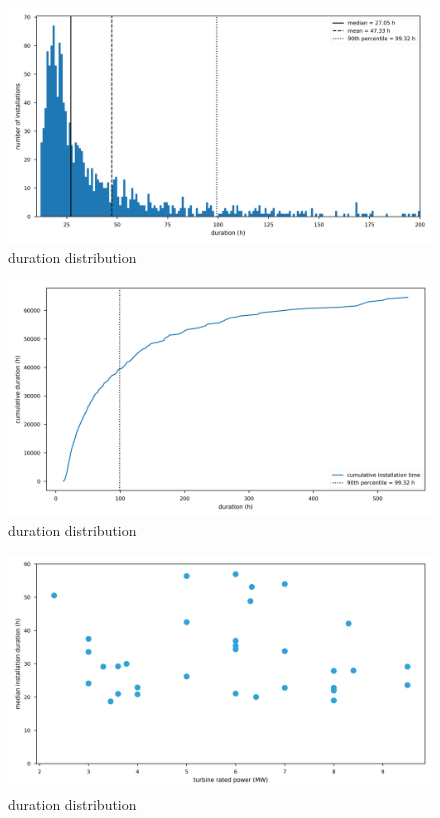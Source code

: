 \documentclass[wes, manuscript]{copernicus}
\begin{document}
\begin{figure}[h]
    \centering
    \includegraphics[width=\textwidth]{figures/duration-distribution.png}
    \caption{duration distribution}
    \label{fig:distribution}
\end{figure}

\begin{figure}[h]
    \centering
    \includegraphics[width=\textwidth]{figures/cumulative-duration.png}
    \caption{duration distribution}
    \label{fig:cumsum}
\end{figure}

\begin{figure}[h]
    \centering
    \includegraphics[width=\textwidth]{figures/durations-rated-power.png}
    \caption{duration distribution}
    \label{fig:size}
\end{figure}
\conclusions  %
\end{document}
